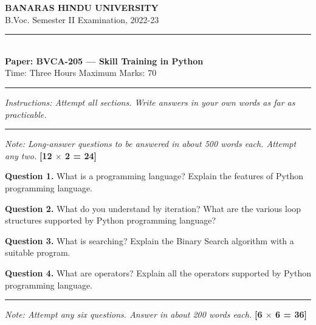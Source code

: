 \documentclass[11pt,a4paper]{article}
\begin{document}
\begin{center}
  {\large\bfseries BANARAS HINDU UNIVERSITY}\\[2pt]
  {\normalsize B.Voc. Semester II Examination, 2022-23}\\[6pt]
  \rule{0.8\linewidth}{0.5pt}\\[6pt]
  {\large\bfseries Paper: BVCA-205 --- Skill Training in Python}\\[4pt]
  {\normalsize Time: Three Hours \hfill Maximum Marks: 70}
\end{center}

\rule{\linewidth}{0.4pt}

\smallskip



\noindent   \textit{Instructions: Attempt all sections. Write answers in your own words as far as practicable.}

\bigskip

\bigskip


\rule{\linewidth}{0.4pt}\smallskip




\noindent   \textit{Note: Long-answer questions to be answered in about 500 words each. Attempt any two.} \hfill   \textbf{[12 $ \times$ 2 = 24]}

\medskip


\noindent   \textbf{Question 1.} What is a programming language? Explain the features of Python programming language.

\medskip


\noindent   \textbf{Question 2.} What do you understand by iteration? What are the various loop structures supported by Python programming language?

\medskip


\noindent   \textbf{Question 3.} What is searching? Explain the Binary Search algorithm with a suitable program.

\medskip


\noindent   \textbf{Question 4.} What are operators? Explain all the operators supported by Python programming language.

\bigskip


\rule{\linewidth}{0.4pt}\smallskip




\noindent   \textit{Note: Attempt any six questions. Answer in about 200 words each.} \hfill   \textbf{[6 $ \times$ 6 = 36]}
\end{document}
